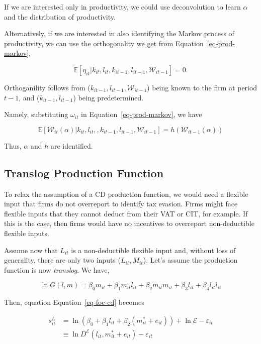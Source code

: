 \documentclass[
  12pt]{article}
\theoremstyle{definition}
\theoremstyle{remark}
\begin{document}
If we are interested only in productivity, we could use deconvolution to
learn \(\alpha\) and the distribution of productivity.

Alternatively, if we are interested in also identifying the Markov
process of productivity, we can use the orthogonality we get from
Equation~\ref{eq-prod-markov},

\[
\mathbb{E}[\eta_{it}|k_{it},l_{it},k_{it-1},l_{it-1},\mathcal{W}_{it-1}]=0.
\]

Orthoganility follows from (\(k_{it-1},l_{it-1},\mathcal{W}_{it-1}\))
being known to the firm at period \(t-1\), and (\(k_{it-1},l_{it-1}\))
being predetermined.

Namely, substituting \(\omega_{it}\) in Equation~\ref{eq-prod-markov},
we have

\[
 \mathbb{E}[\mathcal{W}_{it}(\alpha)|k_{it},l_{it},,k_{it-1},l_{it-1},\mathcal{W}_{it-1}]=h(\mathcal{W}_{it-1}(\alpha))
\]

Thus, \(\alpha\) and \(h\) are identified.

\subsection{Translog Production
Function}\label{translog-production-function}

To relax the assumption of a CD production function, we would need a
flexible input that firms do not overreport to identify tax evasion.
Firms might face flexible inputs that they cannot deduct from their VAT
or CIT, for example. If this is the case, then firms would have no
incentives to overreport non-deductible flexible inputs.

Assume now that \(L_{it}\) is a non-deductible flexible input and,
without loss of generality, there are only two inputs
(\(L_{it}, M_{it}\)). Let's assume the production function is now
\emph{translog}. We have,

\[
 \ln G(l,m)=\beta_0m_{it}+\beta_1m_{it}l_{it}+\beta_2m_{it}m_{it}+\beta_3l_{it}+\beta_4l_{it}l_{it}
\]

Then, equation Equation~\ref{eq-foc-cd} becomes

\[
\begin{aligned}
    s_{it}^{L}&=\ln \left(\beta_0+\beta_1l_{it}+\beta_2(m^*_{it}+e_{it})\right) + \ln \mathcal{E}- \varepsilon_{it} \\
    &\equiv \ln D^{\mathcal{E}}(l_{it},m^*_{it}+e_{it})- \varepsilon_{it} 
\end{aligned}
\]
\end{document}

